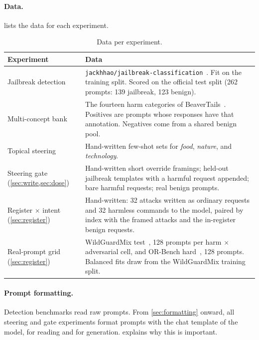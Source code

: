 \documentclass[11pt]{article}
\begin{document}
\paragraph{Data.}  lists the data for each experiment.

\begin{table}[h]
\centering
\small
\caption{Data per experiment.}
\label{tab:data}
\begin{tabularx}{\textwidth}{>{\raggedright\arraybackslash}p{3.2cm}>{\raggedright\arraybackslash}X}
\toprule
Experiment & Data \\
\midrule
Jailbreak detection & \texttt{jackhhao/jailbreak-classification}~\citep{jackhhao2023jailbreak}. Fit on the
  training split. Scored on the official test split (262 prompts: 139 jailbreak, 123 benign). \\
Multi-concept bank & The fourteen harm categories of BeaverTails~\citep{ji2023beavertails}. Positives are
  prompts whose responses have that annotation. Negatives come from a shared benign pool. \\
Topical steering & Hand-written few-shot sets for \emph{food}, \emph{nature}, and \emph{technology}. \\
Steering gate (\cref{sec:write,sec:dose}) & Hand-written short override framings; held-out jailbreak
  templates with a harmful request appended; bare harmful requests; real benign prompts. \\
Register $\times$ intent (\cref{sec:register}) & Hand-written: 32 attacks written as ordinary requests and
  32 harmless commands to the model, paired by index with the framed attacks and the in-register benign
  requests. \\
Real-prompt grid (\cref{sec:register}) & WildGuardMix test~\citep{han2024wildguard}, 128 prompts per harm
  $\times$ adversarial cell, and OR-Bench hard~\citep{cui2024orbench}, 128 prompts. Balanced fits draw from
  the WildGuardMix training split. \\
\bottomrule
\end{tabularx}
\end{table}

\paragraph{Prompt formatting.} Detection benchmarks read raw prompts. From \cref{sec:formatting} onward,
all steering and gate experiments format prompts with the chat template of the model, for reading and for
generation.  explains why this is important.
\end{document}
